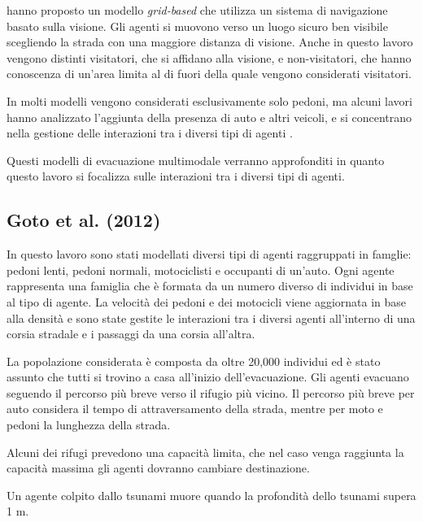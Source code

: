 \textcite{wijerathne2013hpc} hanno proposto un modello \textit{grid-based} che utilizza un sistema di navigazione basato
sulla visione. Gli agenti si muovono verso un luogo sicuro ben visibile scegliendo la strada con una maggiore distanza di visione.
%
Anche in questo lavoro vengono distinti visitatori, che si affidano alla visione, e non-visitatori, che hanno conoscenza di un'area
limita al di fuori della quale vengono considerati visitatori.

\pagebreak

In molti modelli vengono considerati esclusivamente solo pedoni, ma alcuni lavori hanno analizzato l'aggiunta della presenza di auto e altri veicoli,
e si concentrano nella gestione delle interazioni tra i diversi tipi di agenti \parencite{goto2012tsunami, wang2016agent, wang2021novel}.

Questi modelli di evacuazione multimodale verranno approfonditi in quanto questo lavoro si focalizza sulle interazioni tra i diversi tipi di agenti.

\subsection{Goto et al. (2012)}
In questo lavoro sono stati modellati diversi tipi di agenti raggruppati in famglie: pedoni lenti, pedoni normali, motociclisti e occupanti di un'auto.
Ogni agente rappresenta una famiglia che è formata da un numero diverso di individui in base al tipo di agente.
%
La velocità dei pedoni e dei motocicli viene aggiornata in base alla densità
e sono state gestite le interazioni tra i diversi agenti all'interno di una corsia stradale e i passaggi da una corsia all'altra.

La popolazione considerata è composta da oltre 20,000 individui ed è stato assunto che tutti si trovino a casa all'inizio dell'evacuazione.
%
Gli agenti evacuano seguendo il percorso più breve verso il rifugio più vicino. 
Il percorso più breve per auto considera il tempo di attraversamento della strada, mentre per 
moto e pedoni la lunghezza della strada.

Alcuni dei rifugi prevedono una capacità limita, che nel caso venga raggiunta la capacità massima gli agenti dovranno cambiare destinazione.

Un agente colpito dallo tsunami muore quando la profondità dello tsunami supera 1 m.

